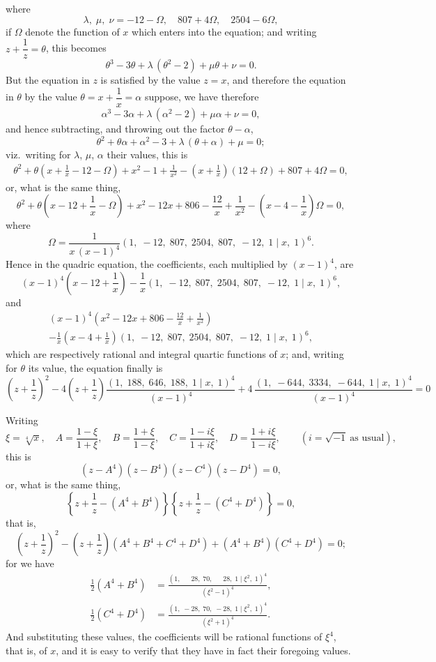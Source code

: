 \documentclass[11pt,a4paper]{book}
\begin{document}
where
\[
\lambda,\; \mu,\; \nu=-12-\Omega,\quad 807+4\Omega,\quad 2504-6\Omega,
\]
if $\Omega$ denote the function of $x$ which enters into the equation; and writing $z+\dfrac{1}{z}=\theta$, this becomes
\[
\theta^3-3\theta+\lambda\,(\theta^2-2)+\mu\theta+\nu=0.
\]
But the equation in $z$ is satisfied by the value $z=x$, and therefore the equation in $\theta$ by the value $\theta=x+\dfrac{1}{x}=\alpha$ suppose, we have therefore
\[
\alpha^3-3\alpha+\lambda\,(\alpha^2-2)+\mu\alpha+\nu=0,
\]
and hence subtracting, and throwing out the factor $\theta-\alpha$,
\[
\theta^2+\theta\alpha+\alpha^2-3+\lambda\,(\theta+\alpha)+\mu=0;
\]
viz.\ writing for $\lambda$, $\mu$, $\alpha$ their values, this is
\begin{multline*}
\theta^2+\theta\left(x+\frac{1}{x}-12-\Omega\right)
+x^2-1+\frac{1}{x^2}-\left(x+\frac{1}{x}\right)(12+\Omega)+807+4\Omega=0,
\end{multline*}
or, what is the same thing,
\[
\theta^2+\theta\left(x-12+\frac{1}{x}-\Omega\right)
+x^2-12x+806-\frac{12}{x}+\frac{1}{x^2}-\left(x-4-\frac{1}{x}\right)\Omega=0,
\]
where
\[
\Omega=\frac{1}{x\,(x-1)^4}(1,\; -12,\; 807,\; 2504,\; 807,\; -12,\; 1\mid x,\; 1)^6.
\]
Hence in the quadric equation, the coefficients, each multiplied by $(x-1)^4$, are
\[
(x-1)^4\left(x-12+\frac{1}{x}\right)
-\frac{1}{x}(1,\; -12,\; 807,\; 2504,\; 807,\; -12,\; 1\mid x,\; 1)^6,
\]
and
\begin{multline*}
(x-1)^4\left(x^2-12x+806-\frac{12}{x}+\frac{1}{x^2}\right)\\
-\frac{1}{x}\left(x-4+\frac{1}{x}\right)
 (1,\; -12,\; 807,\; 2504,\; 807,\; -12,\; 1\mid x,\; 1)^6,
\end{multline*}
which are respectively rational and integral quartic functions of $x$; and, writing for $\theta$ its value, the equation finally is
\[
\left(z+\frac{1}{z}\right)^2
-4\left(z+\frac{1}{z}\right)
 \frac{(1,\; 188,\; 646,\; 188,\; 1\mid x,\; 1)^4}{(x-1)^4}
+4\,\frac{(1,\; -644,\; 3334,\; -644,\; 1\mid x,\; 1)^4}{(x-1)^4}=0
\]

\medskip
\noindent Writing
\[
\xi=\sqrt[4]{x},\quad
A=\frac{1-\xi}{1+\xi},\quad
B=\frac{1+\xi}{1-\xi},\quad
C=\frac{1-i\xi}{1+i\xi},\quad
D=\frac{1+i\xi}{1-i\xi},\qquad (i=\surd{-1}\ \text{as usual}),
\]
this is
\[
(z-A^4)(z-B^4)(z-C^4)(z-D^4)=0,
\]
or, what is the same thing,
\[
\left\{z+\frac{1}{z}-(A^4+B^4)\right\}
\left\{z+\frac{1}{z}-(C^4+D^4)\right\}=0,
\]
that is,
\[
\left(z+\frac{1}{z}\right)^2
-\left(z+\frac{1}{z}\right)(A^4+B^4+C^4+D^4)
+(A^4+B^4)(C^4+D^4)=0;
\]
for we have
\begin{align*}
\tfrac{1}{2}(A^4+B^4)
&=\frac{(1,\; \phantom{-}28,\; 70,\; \phantom{-}28,\; 1\mid\xi^2,\; 1)^4}
        {(\xi^2-1)^4},\\
\tfrac{1}{2}(C^4+D^4)
&=\frac{(1,\; -28,\; 70,\; -28,\; 1\mid\xi^2,\; 1)^4}
        {(\xi^2+1)^4}.
\end{align*}
And substituting these values, the coefficients will be rational functions of $\xi^4$, that is, of $x$, and it is easy to verify that they have in fact their foregoing values.
\end{document}
